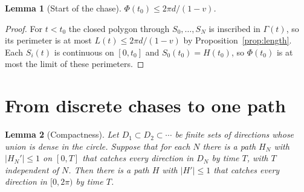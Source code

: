 \documentclass[11pt]{article}
\newtheorem{lemma}{Lemma}
\theoremstyle{remark}\newtheorem{remark}{Remark}
\begin{document}
\begin{lemma}[Start of the chase]\label{lem:start}
$\Phi(t_0)\le 2\pi d/(1-v)$.
\end{lemma}
\begin{proof}
For $t<t_0$ the closed polygon through $S_0,\dots,S_N$ is inscribed in $\Gamma(t)$, so its perimeter is at most $L(t)\le2\pi d/(1-v)$
by Proposition~\ref{prop:length}. Each $S_i(t)$ is continuous on $[0,t_0]$ and $S_0(t_0)=H(t_0)$, so $\Phi(t_0)$ is at most the limit of
these perimeters.
\end{proof}

\section{From discrete chases to one path}
\begin{lemma}[Compactness]\label{lem:limit}
Let $D_1\subset D_2\subset\cdots$ be finite sets of directions whose union is dense in the circle. Suppose that for each $N$
there is a path $H_N$ with $|H_N'|\le1$ on $[0,T]$ that catches every direction in $D_N$ by time $T$, with $T$ independent of $N$.
Then there is a path $H$ with $|H'|\le1$ that catches every direction in $[0,2\pi)$ by time $T$.
\end{lemma}
\end{document}
